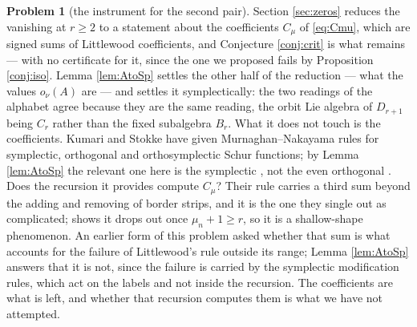 \documentclass[11pt,reqno]{amsart}
\theoremstyle{plain}
\theoremstyle{definition}
\newtheorem{problem}[theorem]{Problem}
\begin{document}
\begin{problem}[the instrument for the second pair]\label{prob:instrument}
Section \ref{sec:zeros} reduces the vanishing at $r\ge2$ to a statement about the coefficients
$C_\mu$ of \eqref{eq:Cmu}, which are signed sums of Littlewood coefficients, and Conjecture
\ref{conj:crit} is what remains --- with no certificate for it, since the one we proposed fails by
Proposition \ref{conj:iso}. Lemma \ref{lem:AtoSp} settles the other half of the reduction --- what
the values $o_\nu(A)$ are --- and settles it symplectically: the two readings of the alphabet agree
because they are the same reading, the orbit Lie algebra of $D_{r+1}$ being $C_r$ rather than the
fixed subalgebra $B_r$. What it does not touch is the coefficients. Kumari and Stokke \cite{KS26}
have given Murnaghan--Nakayama rules for symplectic, orthogonal and orthosymplectic Schur functions;
by Lemma \ref{lem:AtoSp} the relevant one here is the symplectic \cite[Theorem 3.4]{KS26}, not the
even orthogonal \cite[Theorem 3.10]{KS26}. Does the recursion it provides compute $C_\mu$? Their rule
carries a third sum beyond the adding and removing of border strips, and it is the one they single out
as complicated; \cite[Corollary 3.5]{KS26} shows it drops out once $\mu_n+1\ge r$, so it is a
shallow-shape phenomenon. An earlier form of this problem asked whether that sum is what accounts for
the failure of Littlewood's rule outside its range; Lemma \ref{lem:AtoSp} answers that it is not,
since the failure is carried by the symplectic modification rules, which act on the labels and not
inside the recursion. The coefficients are what is left, and whether that recursion computes them is
what we have not attempted.
\end{problem}
\end{document}
